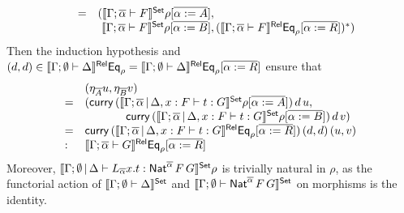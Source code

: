 \documentclass{lmcs}
\theoremstyle{plain}\newtheorem{satz}[thm]{Satz}
\begin{document}
\begin{itemize}
\[\begin{array}{lll}
&  = & (\llbracket{\Gamma;\overline{\alpha} \vdash F}\rrbracket^{\mathsf{Set}}
\rho[\overline{\alpha := A}], \\ 
  & &\,\,\llbracket{\Gamma;\overline{\alpha} \vdash
  F}\rrbracket^{\mathsf{Set}} \rho[\overline{\alpha := B}],
(\llbracket{\Gamma;\overline{\alpha} \vdash F}\rrbracket^{\mathsf{Rel}}
\mathsf{Eq}_{\rho}[\overline{\alpha := R}])^*)
\end{array}\]
Then the induction hypothesis and 
$(d,d) \in \llbracket{\Gamma; \emptyset \vdash \Delta}\rrbracket^{\mathsf{Rel}} \mathsf{Eq}_\rho =
\llbracket{\Gamma; \emptyset \vdash \Delta}\rrbracket^{\mathsf{Rel}} \mathsf{Eq}_\rho[\overline{\alpha := R}]$
ensure that
\[\begin{array}{ll}
& (\eta_{\overline{A}}u,\eta_{\overline{B}}v)\\
= & (\mathsf{curry}\, (\llbracket{\Gamma; \overline{\alpha} \,|\, \Delta, x : F
  \vdash t: G}\rrbracket^{\mathsf{Set}}\rho[\overline{\alpha := A}])\,d\,u, \\
  &\hspace{0.5in} \mathsf{curry}\,
(\llbracket{\Gamma; \overline{\alpha} \,|\, \Delta, x : F \vdash t:
  G}\rrbracket^{\mathsf{Set}}\rho[\overline{\alpha := B}])\,d\,v)\\
= & \mathsf{curry}\, (\llbracket{\Gamma; \overline{\alpha} \,|\, \Delta, x : F
  \vdash t: G}\rrbracket^{\mathsf{Rel}}\mathsf{Eq}_\rho[\overline{\alpha := R}])\,(d,d)\,(u,v)\\
: & \llbracket{\Gamma; \overline{\alpha} \vdash G}\rrbracket^{\mathsf{Rel}}
\mathsf{Eq}_{\rho}[\overline{\alpha := R}]  
\end{array}\]
Moreover,
$\llbracket{\Gamma; \emptyset \,|\, \Delta \vdash L_{\overline{\alpha}} x.t
: \mathsf{Nat}^{\overline{\alpha}} \,F \,G}\rrbracket^{\mathsf{Set}} \rho$
is trivially natural in $\rho$,
as the functorial action of
$\llbracket{\Gamma; \emptyset \vdash \Delta}\rrbracket^{\mathsf{Set}}$
and $\llbracket{\Gamma; \emptyset \vdash \mathsf{Nat}^{\overline{\alpha}} \,F \,G}\rrbracket^{\mathsf{Set}}$
on morphisms is the identity.


\end{itemize}
\end{document}
